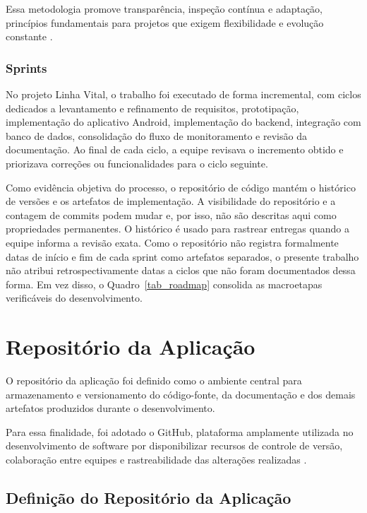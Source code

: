 Essa metodologia promove transparência, inspeção contínua e adaptação, princípios fundamentais para projetos que exigem flexibilidade e evolução constante \cite{scrumguide2020}.

\subsubsection{Sprints}

No projeto Linha Vital, o trabalho foi executado de forma incremental, com ciclos dedicados a levantamento e refinamento de requisitos, prototipação, implementação do aplicativo Android, implementação do backend, integração com banco de dados, consolidação do fluxo de monitoramento e revisão da documentação. Ao final de cada ciclo, a equipe revisava o incremento obtido e priorizava correções ou funcionalidades para o ciclo seguinte.

Como evidência objetiva do processo, o repositório de código mantém o histórico de versões e os artefatos de implementação. A visibilidade do repositório e a contagem de commits podem mudar e, por isso, não são descritas aqui como propriedades permanentes. O histórico é usado para rastrear entregas quando a equipe informa a revisão exata. Como o repositório não registra formalmente datas de início e fim de cada sprint como artefatos separados, o presente trabalho não atribui retrospectivamente datas a ciclos que não foram documentados dessa forma. Em vez disso, o Quadro~\ref{tab_roadmap} consolida as macroetapas verificáveis do desenvolvimento.

\section{Repositório da Aplicação}

O repositório da aplicação foi definido como o ambiente central para armazenamento e versionamento do código-fonte, da documentação e dos demais artefatos produzidos durante o desenvolvimento.

Para essa finalidade, foi adotado o GitHub, plataforma amplamente utilizada no desenvolvimento de software por disponibilizar recursos de controle de versão, colaboração entre equipes e rastreabilidade das alterações realizadas \cite{progit2014, githubdocs2026}.

\subsection{Definição do Repositório da Aplicação}

